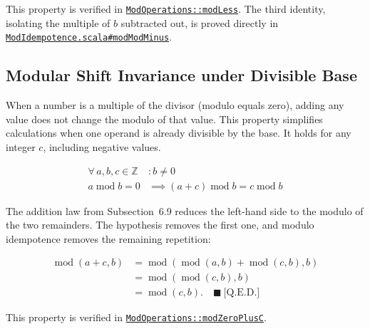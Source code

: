 This property is verified in
\href{https://github.com/thiagomata/prime-numbers/blob/modulo-article-v1.0.0/src/main/scala/v1/chapter2/div/properties/ModOperations.scala#modLess}{\texttt{ModOperations::modLess}}.
The third identity, isolating the multiple of $b$ subtracted out, is proved
directly in
\href{https://github.com/thiagomata/prime-numbers/blob/modulo-article-v1.0.0/src/main/scala/v1/chapter2/div/properties/ModIdempotence.scala#modModMinus}{\texttt{ModIdempotence.scala\#modModMinus}}.

\subsection{Modular Shift Invariance under Divisible Base}
\label{sec:divisible-base-shift}

When a number is a multiple of the divisor (modulo equals zero), adding any
value does not change the modulo of that value. This property simplifies
calculations when one operand is already divisible by the base. It holds for
any integer $c$, including negative values.

\begin{equation*}
\begin{aligned}
\forall\, a, b, c \in \mathbb{Z} &: b \neq 0 \\
a \operatorname{mod} b = 0
  &\implies ( a + c ) \operatorname{mod} b = c \operatorname{mod} b
\end{aligned}
\end{equation*}

The addition law from Subsection~6.9 reduces the left-hand side to the
modulo of the two remainders. The hypothesis removes the first one, and
modulo idempotence removes the remaining repetition:

\begin{equation*}
\begin{aligned}
\operatorname{mod}(a+c,b)
  &= \operatorname{mod}(\operatorname{mod}(a,b)+\operatorname{mod}(c,b),b) \\
  &= \operatorname{mod}(\operatorname{mod}(c,b),b) \\
  &= \operatorname{mod}(c,b). \quad \blacksquare\ \text{[Q.E.D.]}
\end{aligned}
\end{equation*}

This property is verified in
\href{https://github.com/thiagomata/prime-numbers/blob/modulo-article-v1.0.0/src/main/scala/v1/chapter2/div/properties/ModOperations.scala#modZeroPlusC}{\texttt{ModOperations::modZeroPlusC}}.


